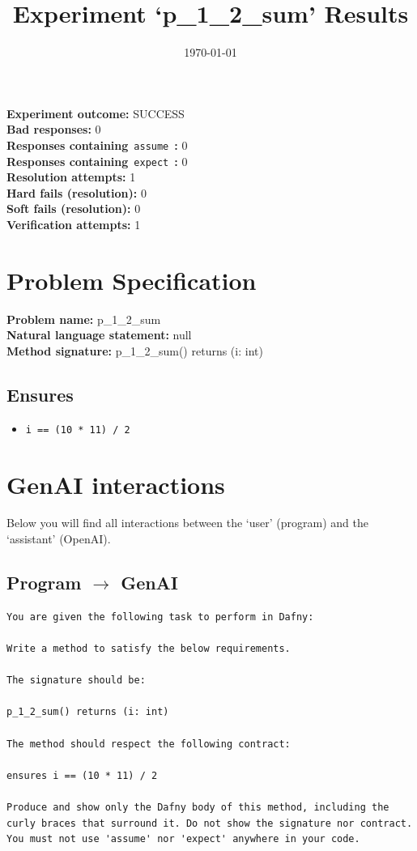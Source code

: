 \documentclass{article}
\begin{document}
\title{Experiment `p\_1\_2\_sum' Results}
\author{\today}
\date{}
\maketitle
\textbf{Experiment outcome: }SUCCESS
\\\textbf{Bad responses: }0
\\\textbf{Responses containing}~\texttt{assume}~\textbf{: }0
\\\textbf{Responses containing}~\texttt{expect}~\textbf{: }0
\\\textbf{Resolution attempts: }1
\\\textbf{Hard fails (resolution): }0
\\\textbf{Soft fails (resolution): }0
\\\textbf{Verification attempts: }1
\section*{Problem Specification}
\textbf{Problem name: }p\_1\_2\_sum
\\\textbf{Natural language statement: }null
\\\textbf{Method signature: }p\_1\_2\_sum() returns (i: int)
\subsection*{Ensures}
\begin{itemize}
\item \texttt{i == (10 * 11) / 2}
\end{itemize}
\clearpage
\section*{GenAI interactions}
Below you will find all interactions between the `user' (program) and the `assistant' (OpenAI).
\subsection*{Program $\rightarrow$ GenAI}
\begin{lstlisting}
You are given the following task to perform in Dafny:

Write a method to satisfy the below requirements.

The signature should be:

p_1_2_sum() returns (i: int)

The method should respect the following contract:

ensures i == (10 * 11) / 2

Produce and show only the Dafny body of this method, including the curly braces that surround it. Do not show the signature nor contract. You must not use 'assume' nor 'expect' anywhere in your code.
\end{lstlisting}
\end{document}
